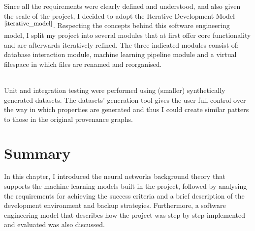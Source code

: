 Since all the requirements were clearly defined and understood, and also given the scale of the project, I decided to adopt the Iterative Development Model$^{\small \cite{iterative_model}}$. Respecting the concepts behind this software engineering model, I split my project into several modules that at first offer core functionality and are afterwards iteratively refined. The three indicated modules
consist of: database interaction module, machine learning pipeline module and a virtual filespace in which files are renamed and reorganised. \\\

Unit and integration testing were performed using (smaller) synthetically generated datasets. The datasets' generation tool gives the user full control over the way in which properties are generated and thus I could create similar patters to those in the original provenance graphs. \\

\section{Summary}

In this chapter, I introduced the neural networks background theory that supports the machine learning models built in the project, followed by analysing the requirements for achieving the success criteria and a brief description of the development environment and backup strategies. Furthermore, a software engineering model that describes how the project was step-by-step implemented and evaluated was also discussed. \\

